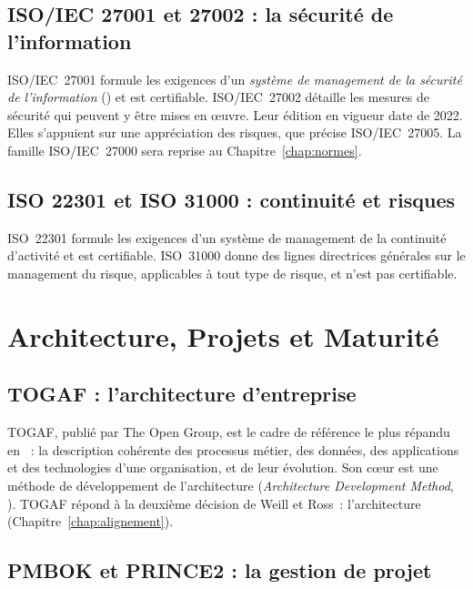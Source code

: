 \subsection{ISO/IEC 27001 et 27002 : la sécurité de l'information}

ISO/IEC~27001 formule les exigences d'un \emph{système de management de la
sécurité de l'information} () et est certifiable. ISO/IEC~27002
détaille les mesures de sécurité qui peuvent y être mises en œuvre. Leur
édition en vigueur date de 2022. Elles s'appuient sur une appréciation des
risques, que précise ISO/IEC~27005. La famille ISO/IEC~27000 sera reprise
au Chapitre~\ref{chap:normes}.

\subsection{ISO 22301 et ISO 31000 : continuité et risques}

ISO~22301 formule les exigences d'un système de management de la
continuité d'activité et est certifiable. ISO~31000 donne des lignes
directrices générales sur le management du risque, applicables à tout
type de risque, et n'est pas certifiable.

\section{Architecture, Projets et Maturité}
\label{sec:c04-projets}

\subsection{TOGAF : l'architecture d'entreprise}

TOGAF, publié par The Open Group, est le cadre de référence le plus
répandu en ~: la description cohérente des processus métier, des
données, des applications et des technologies d'une organisation, et de
leur évolution. Son cœur est une méthode de développement de
l'architecture (\textit{Architecture Development Method}, ).
TOGAF répond à la deuxième décision de Weill et Ross~: l'architecture
(Chapitre~\ref{chap:alignement}).

\subsection{PMBOK et PRINCE2 : la gestion de projet}

